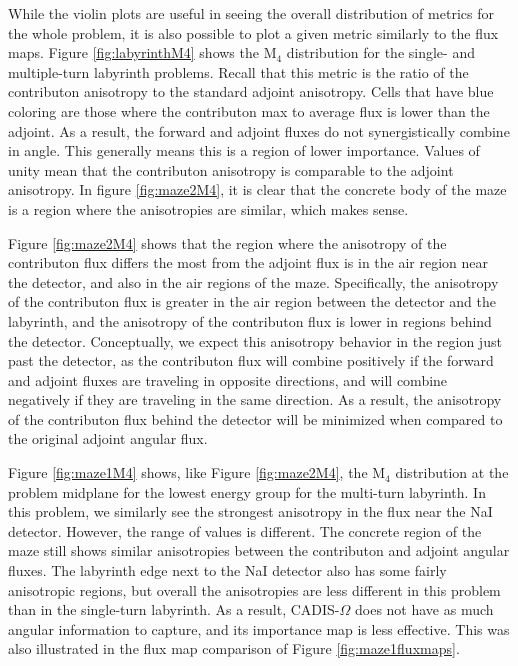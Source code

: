 While the violin plots are useful in seeing
the overall distribution of metrics for the whole problem, it is also possible
to plot a given metric similarly to the flux maps. Figure
\ref{fig:labyrinthM4} shows the M$_4$ distribution for the single- and multiple-turn 
labyrinth problems. Recall that this metric is the ratio of the contributon
anisotropy to the standard adjoint anisotropy. Cells that have blue coloring
are those where the contributon max to average flux is lower than the adjoint.
As a result, the forward and adjoint fluxes do not synergistically combine in
angle. This
generally means this is a region of lower importance. Values of unity mean that
the contributon anisotropy is comparable to the adjoint anisotropy. In figure
\ref{fig:maze2M4}, it is clear that the concrete body of the maze is a region
where the anisotropies are similar, which makes sense.

Figure \ref{fig:maze2M4} shows that the region where the anisotropy of the
contributon flux differs the most from the adjoint flux is in the air region
near the detector, and also in the air regions of the maze. Specifically, the
anisotropy of the contributon flux is greater in the air region between the
detector and the labyrinth, and the anisotropy of the contributon flux is lower in
regions behind the detector. Conceptually, we expect this anisotropy behavior
in the region just past the detector, as the contributon flux will combine
positively if the forward and adjoint fluxes are traveling in opposite
directions, and will combine negatively if they are traveling in the same
direction. As a result, the anisotropy of the contributon flux behind the
detector will be minimized when compared to the original adjoint angular flux.

Figure \ref{fig:maze1M4} shows, like Figure \ref{fig:maze2M4}, the M$_4$
distribution at the problem midplane for the lowest energy group for
the multi-turn labyrinth. In this problem, we similarly see the strongest
anisotropy in the flux near the NaI detector. However, the range of values is
different. The concrete region of the maze still shows similar anisotropies
between the contributon and adjoint angular fluxes. The labyrinth edge next to the
NaI detector also has some fairly anisotropic regions, but overall the
anisotropies are less different in this problem than in the single-turn
labyrinth. As a result, CADIS-$\Omega$ does not have as much angular information
to capture, and its importance map is less effective. This was also illustrated
in the flux map comparison of Figure \ref{fig:maze1fluxmaps}.

